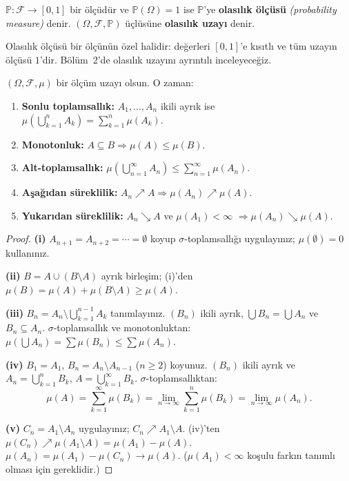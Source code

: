 \begin{tanim}\label{def:olasilikolucu}
$\mathbb{P}: \mathcal{F} \to [0,1]$ bir ölçüdür ve $\mathbb{P}(\Omega) = 1$
ise $\mathbb{P}$'ye \textbf{olasılık ölçüsü} \emph{(probability measure)} denir.
$(\Omega, \mathcal{F}, \mathbb{P})$ üçlüsüne \textbf{olasılık uzayı} denir.
\end{tanim}

\begin{notkutu}
Olasılık ölçüsü bir ölçünün özel halidir: değerleri $[0,1]$'e kısıtlı ve
tüm uzayın ölçüsü $1$'dir. Bölüm~2'de olasılık uzayını ayrıntılı inceleyeceğiz.
\end{notkutu}

\begin{teorem}\label{thm:olcuozellik}
$(\Omega, \mathcal{F}, \mu)$ bir ölçüm uzayı olsun. O zaman:
\begin{enumerate}[label=(\roman*)]
  \item \textbf{Sonlu toplamsallık:} $A_1, \ldots, A_n$ ikili ayrık ise
        $\mu\!\left(\bigcup_{k=1}^n A_k\right) = \sum_{k=1}^n \mu(A_k)$.
  \item \textbf{Monotonluk:} $A \subseteq B \Rightarrow \mu(A) \leq \mu(B)$.
  \item \textbf{Alt-toplamsallık:} $\mu\!\left(\bigcup_{n=1}^\infty A_n\right)
        \leq \sum_{n=1}^\infty \mu(A_n)$.
  \item \textbf{Aşağıdan süreklilik:} $A_n \nearrow A \Rightarrow \mu(A_n) \nearrow \mu(A)$.
  \item \textbf{Yukarıdan süreklilik:} $A_n \searrow A$ ve $\mu(A_1) < \infty$
        $\Rightarrow \mu(A_n) \searrow \mu(A)$.
\end{enumerate}
\end{teorem}

\begin{proof}
\textbf{(i)} $A_{n+1} = A_{n+2} = \cdots = \emptyset$ koyup $\sigma$-toplamsallığı uygulayınız;
$\mu(\emptyset) = 0$ kullanınız.

\textbf{(ii)} $B = A \cup (B \setminus A)$ ayrık birleşim; (i)'den
$\mu(B) = \mu(A) + \mu(B \setminus A) \geq \mu(A)$.

\textbf{(iii)} $B_n = A_n \setminus \bigcup_{k=1}^{n-1} A_k$ tanımlayınız.
$(B_n)$ ikili ayrık, $\bigcup B_n = \bigcup A_n$ ve $B_n \subseteq A_n$.
$\sigma$-toplamsallık ve monotonluktan:
$\mu(\bigcup A_n) = \sum \mu(B_n) \leq \sum \mu(A_n)$.

\textbf{(iv)} $B_1 = A_1$, $B_n = A_n \setminus A_{n-1}$ ($n \geq 2$) koyunuz.
$(B_n)$ ikili ayrık ve $A_n = \bigcup_{k=1}^n B_k$, $A = \bigcup_{k=1}^\infty B_k$.
$\sigma$-toplamsallıktan:
\[
  \mu(A) = \sum_{k=1}^\infty \mu(B_k) = \lim_{n\to\infty} \sum_{k=1}^n \mu(B_k) = \lim_{n\to\infty} \mu(A_n).
\]

\textbf{(v)} $C_n = A_1 \setminus A_n$ uygulayınız; $C_n \nearrow A_1 \setminus A$.
(iv)'ten $\mu(C_n) \nearrow \mu(A_1 \setminus A) = \mu(A_1) - \mu(A)$.
$\mu(A_n) = \mu(A_1) - \mu(C_n) \to \mu(A)$.
($\mu(A_1) < \infty$ koşulu farkın tanımlı olması için gereklidir.)
\end{proof}

